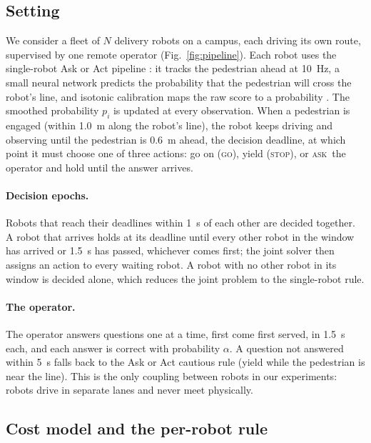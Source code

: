 \documentclass[a4paper,fleqn]{cas-dc}
\newcommand{\pgo}{\textsc{go}}
\newcommand{\pstop}{\textsc{stop}}
\newcommand{\pask}{\textsc{ask}}
\begin{document}
\subsection{Setting}
\label{sec:setting}

We consider a fleet of $N$ delivery robots on a campus, each driving its own route, supervised by one remote operator (Fig.~\ref{fig:pipeline}). Each robot uses the single-robot Ask or Act pipeline \citep{udekwe2026askoract}: it tracks the pedestrian ahead at \SI{10}{Hz}, a small neural network predicts the probability that the pedestrian will cross the robot's line, and isotonic calibration maps the raw score to a probability \cite{van2023causal}. The smoothed probability $p_i$ is updated at every observation. When a pedestrian is engaged (within \SI{1.0}{m} along the robot's line), the robot keeps driving and observing until the pedestrian is \SI{0.6}{m} ahead, the decision deadline, at which point it must choose one of three actions: go on (\pgo), yield (\pstop), or \pask\ the operator and hold until the answer arrives.

\paragraph{Decision epochs.} Robots that reach their deadlines within \SI{1}{s} of each other are decided together. A robot that arrives holds at its deadline until every other robot in the window has arrived or \SI{1.5}{s} has passed, whichever comes first; the joint solver then assigns an action to every waiting robot. A robot with no other robot in its window is decided alone, which reduces the joint problem to the single-robot rule.

\paragraph{The operator.} The operator answers questions one at a time, first come first served, in \SI{1.5}{s} each, and each answer is correct with probability $\alpha$. A question not answered within \SI{5}{s} falls back to the Ask or Act cautious rule (yield while the pedestrian is near the line). This is the only coupling between robots in our experiments: robots drive in separate lanes and never meet physically.

\subsection{Cost model and the per-robot rule}
\label{sec:cost}
\end{document}
